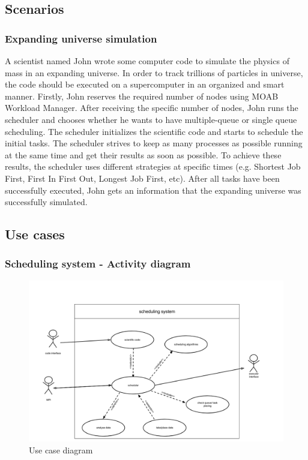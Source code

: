 \subsection{Scenarios}
			
\subsubsection{Expanding universe simulation}

A scientist named John wrote some computer code to simulate the physics of mass in an expanding universe. In order to track trillions of particles in universe, the code should be executed on a supercomputer in an organized and smart manner. 
Firstly, John reserves the required number of nodes using MOAB Workload Manager. After receiving the specific number of nodes, John runs the scheduler and chooses whether he wants to have multiple-queue or single queue scheduling. The scheduler initializes the scientific code and starts to schedule the initial tasks. The scheduler strives to keep as many processes as possible running at the same time and get
their results as soon as possible. To achieve these results, the scheduler uses different strategies at specific times (e.g. Shortest Job First, First In First Out, Longest Job First, etc). After all tasks have been successfully executed, John gets an information that the expanding universe was successfully simulated. 

\subsection{Use cases}

\subsubsection{Scheduling system - Activity diagram}
	\begin{figure}[H]
		\includegraphics[width=1.5\textwidth,scale=0.75,trim=7cm 0 -7cm 0]{images/usecasediagram.png}
		\caption{Use case diagram}
	\end{figure}

